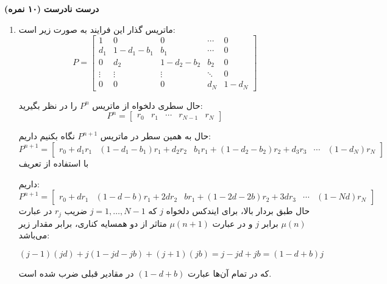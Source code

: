 \Large \textbf{درست نادرست}
\large \textbf{(۱۰ نمره)}

\normalsize \vspace{0.5cm}

\begin{enumerate}[label=(\alph*)]
	\item
	ماتریس گذار این فرایند به صورت زیر است:
	$$
	P = \left[ {\begin{array}{*{20}{c}}
			1&0&0& \cdots &0\\
			{{d_1}}&{1 - {d_1} - {b_1}}&{{b_1}}& \cdots &0\\
			0&{{d_2}}&{1 - {d_2} - {b_2}}&{{b_2}}&0\\
			\vdots & \vdots & \vdots & \ddots &0\\
			0&0&0&{{d_N}}&{1 - {d_N}}
	\end{array}} \right]
	$$
	
	حال سطری دلخواه از ماتریس
	${P^n}$
	را در نظر بگیرید:
	$$
	{P^n} = \left[ {\begin{array}{*{20}{c}}
			{{r_0}}&{{r_1}}& \cdots &{{r_{N - 1}}}&{{r_N}}
	\end{array}} \right]
	$$
	
	حال به همین سطر در ماتریس
	${P^{n + 1}}$
	نگاه بکنیم داریم:
	$$
	{P^{n + 1}} = \left[ {\begin{array}{*{20}{c}}
			{{r_0} + {d_1}{r_1}}&{\left( {1 - {d_1} - {b_1}} \right){r_1} + {d_2}{r_2}}&{{b_1}{r_1} + \left( {1 - {d_2} - {b_2}} \right){r_2} + {d_3}{r_3}}& \cdots &{\left( {1 - {d_N}} \right){r_N}}
	\end{array}} \right]
	$$
	با استفاده از تعریف
	
	داریم:
	$$
	{P^{n + 1}} = \left[ {\begin{array}{*{20}{c}}
			{{r_0} + d{r_1}}&{\left( {1 - d - b} \right){r_1} + 2d{r_2}}&{b{r_1} + \left( {1 - 2d - 2b} \right){r_2} + 3d{r_3}}& \cdots &{\left( {1 - Nd} \right){r_N}}
	\end{array}} \right]
	$$
	حال طبق بردار بالا،‌ برای ایندکس دلخواه
	$j$
	که
	$j = 1, \ldots ,N - 1$
	ضریب
	${r_j}$
	در عبارت
	$\mu \left( n \right)$
	برابر $j$ و در عبارت
	$\mu \left( {n + 1} \right)$
	متاثر از دو همسایه کناری، برابر مقدار زیر می‌باشد:
	
	$$
	\left( {j - 1} \right)\left( {jd} \right) + j\left( {1 - jd - jb} \right) + \left( {j + 1} \right)\left( {jb} \right) = j - jd + jb = \left( {1 - d + b} \right)j
	$$
	
	که در تمام آن‌ها عبارت
	$\left( {1 - d + b} \right)$
	در مقادیر قبلی ضرب شده است.\\
	

\end{enumerate}
